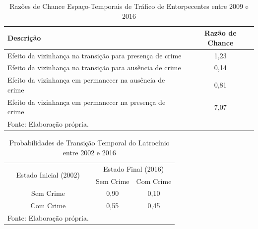 \documentclass[12pt,openright,oneside,a4paper,english,french,spanish]{abntex2}
\numberwithin{table}{section} %
\numberwithin{figure}{section} %
\begin{document}
\begin{subappendices}
\begin{table}[H]
\centering
\caption{Razões de Chance Espaço-Temporais de Tráfico de Entorpecentes entre 2009 e 2016}
        \begin{tabular}{lc}
            \hline
            {\textbf{Descrição}} & {\textbf{Razão de Chance}} \\\hline
            {Efeito da vizinhança na transição para presença de crime} & {1,23} \\
            {Efeito da vizinhança na transição para ausência de crime} & {0,14} \\
            {Efeito da vizinhança em permanecer na ausência de crime} & {0,81} \\
            {Efeito da vizinhança em permanecer na presença de crime} & {7,07} \\\hline
            \tiny Fonte: Elaboração própria.
        \end{tabular}
    \label{tab:odds_espaco_tempo_trafico_2009_2016}
\end{table}



















\begin{table}[H]
\centering
\caption{Probabilidades de Transição Temporal do Latrocínio entre 2002 e 2016}
        \begin{tabular}{ccc}
            \hline
            \multirow{2}{*}{Estado Inicial (2002)} & \multicolumn{2}{c}{Estado Final (2016)}  \\\cline{2-3} 
                                     & \multicolumn{1}{l}{Sem Crime} & \multicolumn{1}{l}{Com Crime} \\\hline
            {Sem Crime} & {0,90} & {0,10} \\                \hline
            {Com Crime} & {0,55} & {0,45} \\                \hline
            \tiny Fonte: Elaboração própria.
        \end{tabular}
    \label{tab:prob_tempo_latrocinio_2002_2016}
\end{table}


\end{subappendices}
\end{document}
